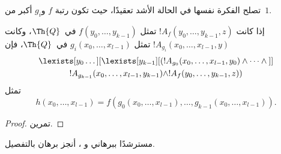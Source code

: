 \documentclass[../../../include/open-logic-section]{subfiles}
\begin{document}
تصلح الفكرة نفسها في الحالة الأشد تعقيدًا، حيث تكون رتبة $f$ و$g_i$
أكبر من~$1$.

\begin{prop}
إذا كانت $!A_f(y_0,\dots,y_{k-1},z)$ تمثل
$f(y_0,\dots,y_{k-1})$ في~$\Th{Q}$، وكانت
$!A_{g_i}(x_0,\dots,x_{l-1},y)$ تمثل
$g_i(x_0,\dots,x_{l-1})$ في~$\Th{Q}$، فإن
\begin{multline*}
  \lexists[y_0\dots][\lexists[y_{k-1}][(!A_{g_0}(x_0,\dots,x_{l-1},y_0) \land
      \dots \land {}]]\\
  !A_{g_{k-1}}(x_0,\dots,x_{l-1},y_{k-1}) \land !A_f(y_0,\dots,y_{k-1},z))
\end{multline*}
تمثل
\[
h(x_0, \dots, x_{l-1}) = f(g_0(x_0, \dots, x_{l-1}), \dots, g_{k-1}(x_0,
\dots, x_{l-1})).
\]
\end{prop}

\begin{proof}
تمرين.
\end{proof}

\begin{prob}
مسترشدًا ببرهاني  و
، أنجز برهان
 بالتفصيل.
\end{prob}
\end{document}
